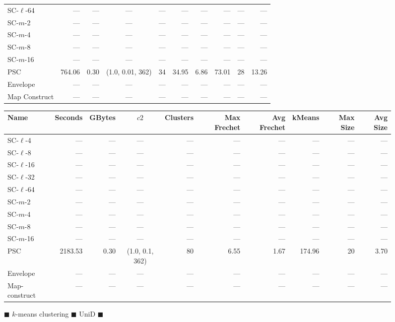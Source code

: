 \begin{figure}
\begin{center}
\begin{minipage}{\textwidth}
{\begin{tabular}{@{}lrrcrrrrrr@{}}
SC-$\ell$-64 & --- & --- & --- & --- & --- & --- & --- & --- & ---\\
SC-$m$-2 & --- & --- & --- & --- & --- & --- & --- & --- & ---\\
SC-$m$-4 & --- & --- & --- & --- & --- & --- & --- & --- & ---\\
SC-$m$-8 & --- & --- & --- & --- & --- & --- & --- & --- & ---\\
SC-$m$-16 & --- & --- & --- & --- & --- & --- & --- & --- & ---\\
PSC & 764.06 & 0.30 & (1.0, 0.01, 362) & 34 & 34.95 & 6.86 & 73.01 & 28 & 13.26\\
Envelope & --- & --- & --- & --- & --- & --- & --- & --- & ---\\
Map Construct & --- & --- & --- & --- & --- & --- & --- & --- & ---\\
        \bottomrule
    \end{tabular}
    }
    {
    \begin{tabular}{@{}lrrcrrrrrr@{}}
        \toprule
        Name & Seconds & GBytes & $c2$ & Clusters & Max Frechet & Avg Frechet & kMeans & Max Size & Avg Size\\
        \midrule
        SC-$\ell$-4 & --- & --- & --- & --- & --- & --- & --- & --- & ---\\
SC-$\ell$-8 & --- & --- & --- & --- & --- & --- & --- & --- & ---\\
SC-$\ell$-16 & --- & --- & --- & --- & --- & --- & --- & --- & ---\\
SC-$\ell$-32 & --- & --- & --- & --- & --- & --- & --- & --- & ---\\
SC-$\ell$-64 & --- & --- & --- & --- & --- & --- & --- & --- & ---\\
SC-$m$-2 & --- & --- & --- & --- & --- & --- & --- & --- & ---\\
SC-$m$-4 & --- & --- & --- & --- & --- & --- & --- & --- & ---\\
SC-$m$-8 & --- & --- & --- & --- & --- & --- & --- & --- & ---\\
SC-$m$-16 & --- & --- & --- & --- & --- & --- & --- & --- & ---\\
PSC & 2183.53 & 0.30 & (1.0, 0.1, 362) & 80 & 6.55 & 1.67 & 174.96 & 20 & 3.70\\
Envelope & --- & --- & --- & --- & --- & --- & --- & --- & ---\\
Map-construct & --- & --- & --- & --- & --- & --- & --- & --- & ---\\
        \bottomrule
    \end{tabular}
    }
\end{minipage}
\end{center}
        \caption{$\blacksquare$ $k$-means clustering $\blacksquare$ UniD $\blacksquare$}
 \end{figure}
